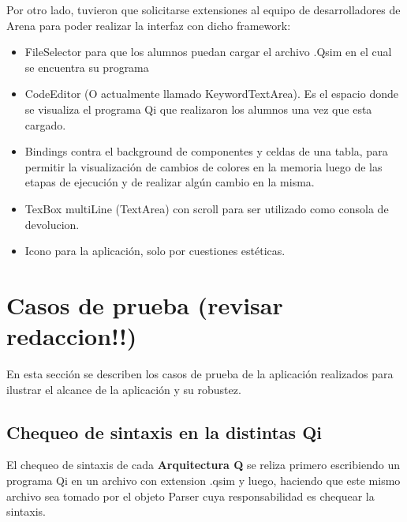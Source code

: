 Por otro lado, tuvieron que solicitarse extensiones al equipo de desarrolladores de Arena para poder realizar la interfaz con dicho framework:

\begin{itemize}
\item FileSelector para que los alumnos puedan cargar el archivo .Qsim en el cual se encuentra su programa
\item CodeEditor (O actualmente llamado KeywordTextArea). Es el espacio donde se visualiza el programa Qi que realizaron los alumnos una vez que esta cargado.
\item Bindings contra el background de componentes y celdas de una tabla, para permitir la visualización de cambios de colores en la memoria luego de las etapas de ejecución y de realizar algún cambio en la misma.
\item TexBox multiLine (TextArea) con scroll para ser utilizado como consola de devolucion.
\item Icono para la aplicación, solo por cuestiones estéticas.
\end{itemize}

\section{Casos de prueba (revisar redaccion!!)}

En esta sección se describen los casos de prueba de la aplicación realizados para ilustrar el alcance de la aplicación y su robustez.

\subsection{Chequeo de sintaxis en la distintas Qi}

El chequeo de sintaxis de cada \textbf{Arquitectura Q} se reliza primero escribiendo un programa Qi en un archivo con extension .qsim y luego, haciendo que este mismo archivo sea tomado por el objeto Parser cuya responsabilidad es chequear la sintaxis. 

